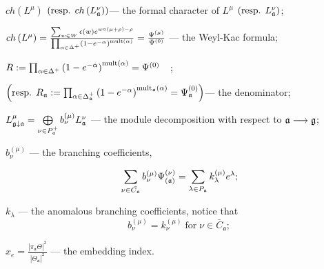 \documentclass[a4paper,12pt]{article}
\theoremstyle{definition}
\theoremstyle{definition}
\theoremstyle{definition}
\newcommand{\pia}{\pi_{\mathfrak{a}}}
\newcommand{\af}{\mathfrak{a}}
\begin{document}
$ch\left( L^{\mu }\right) $ $\left( \mbox{resp. }ch\left( L_{\frak{a}}^{\nu
}\right) \right) $--- the formal character of $L^{\mu }$ $\left( \mbox{resp. }%
L_{\frak{a}}^{\nu }\right) $;

$ch\left( L^{\mu }\right) =\frac{\sum_{w\in W}\epsilon (w)e^{w\circ (\mu
+\rho )-\rho }}{\prod_{\alpha \in \Delta ^{+}}\left( 1-e^{-\alpha }\right) ^{%
\mathrm{{mult}\left( \alpha \right) }}}=\frac{\Psi ^{\left( \mu \right) }}{%
\Psi ^{\left( 0\right) }}$ --- the Weyl-Kac formula;

$R:=\prod_{\alpha \in \Delta ^{+}}\left( 1-e^{-\alpha }\right) ^{\mathrm{{%
mult}\left( \alpha \right) }}=\Psi ^{\left( 0\right) }\quad $;

\noindent $\left( \mbox{resp. }R_{\frak{a}}:=\prod_{\alpha \in \Delta _{%
\frak{a}}^{+}}\left( 1-e^{-\alpha }\right) ^{\mathrm{mult}_{\frak{a}}\mathrm{%
\left( \alpha \right) }}=\Psi _{\frak{a}}^{\left( 0\right) }\right) $--- the
denominator;

$  L_{\frak{g}\downarrow \frak{a}}^{\mu }=\bigoplus
\limits_{\nu \in P_{\frak{a}}^{+}}b_{\nu }^{\left( \mu \right) }L_{\frak{a}}^{\nu }$
 --- the module decomposition with respect to $\frak{a}\longrightarrow \frak{g}$;


$b^{(\mu)}_{\nu}$ --- the branching coefficients,

\begin{equation}
  \label{eq:21}
  \sum_{\nu \in \bar{C_{\af}}}b_{\nu }^{\left( \mu \right) }\Psi _{\left( \frak{%
        a}\right) }^{\left( \nu \right) }=\sum_{\lambda \in P_{\frak{a}}}k_{\lambda
  }^{\left( \mu \right) }e^{\lambda };
\end{equation}

 $k_{\lambda}$ --- the anomalous branching coefficients, notice that
\begin{equation*}
  b^{(\mu)}_{\nu}=k^{(\mu)}_{\nu} \; \mbox{for} \; \nu\in \bar{C}_{\af};
\end{equation*}

$x_e=\frac{\left|\pia \Theta\right|^2}{\left|\Theta_{\af}\right|^2}$ --- the embedding index.
\end{document}
